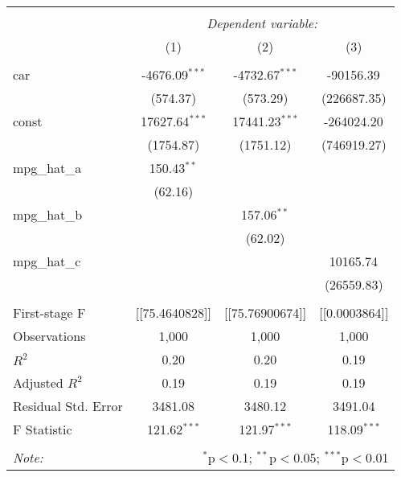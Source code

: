 \begin{table}[!htbp] \centering
\begin{tabular}{@{\extracolsep{5pt}}lccc}
\\[-1.8ex]\hline
\hline \\[-1.8ex]
& \multicolumn{3}{c}{\textit{Dependent variable:}} \
\cr \cline{3-4}
\\[-1.8ex] & (1) & (2) & (3) \\
\hline \\[-1.8ex]
 car & -4676.09$^{***}$ & -4732.67$^{***}$ & -90156.39$^{}$ \\
  & (574.37) & (573.29) & (226687.35) \\
 const & 17627.64$^{***}$ & 17441.23$^{***}$ & -264024.20$^{}$ \\
  & (1754.87) & (1751.12) & (746919.27) \\
 mpg_hat_a & 150.43$^{**}$ & & \\
  & (62.16) & & \\
 mpg_hat_b & & 157.06$^{**}$ & \\
  & & (62.02) & \\
 mpg_hat_c & & & 10165.74$^{}$ \\
  & & & (26559.83) \\
\hline \\[-1.8ex]
 First-stage F & [[75.4640828]] & [[75.76900674]] & [[0.0003864]] \\
 Observations & 1,000 & 1,000 & 1,000 \\
 $R^2$ & 0.20 & 0.20 & 0.19 \\
 Adjusted $R^2$ & 0.19 & 0.19 & 0.19 \\
 Residual Std. Error & 3481.08 & 3480.12 & 3491.04  \\
 F Statistic & 121.62$^{***}$  & 121.97$^{***}$  & 118.09$^{***}$  \\
\hline
\hline \\[-1.8ex]
\textit{Note:} & \multicolumn{3}{r}{$^{*}$p$<$0.1; $^{**}$p$<$0.05; $^{***}$p$<$0.01} \\
\end{tabular}
\end{table}